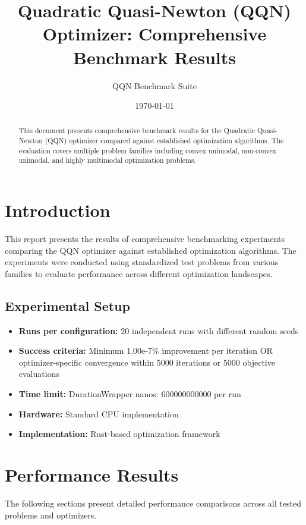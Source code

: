 \documentclass[10pt]{article}
\title{Quadratic Quasi-Newton (QQN) Optimizer: Comprehensive Benchmark Results}
\author{QQN Benchmark Suite}
\date{\today}
\begin{document}
\small
\maketitle
\begin{abstract}
This document presents comprehensive benchmark results for the Quadratic Quasi-Newton (QQN) optimizer compared against established optimization algorithms. The evaluation covers multiple problem families including convex unimodal, non-convex unimodal, and highly multimodal optimization problems.
\end{abstract}
\section{Introduction}
This report presents the results of comprehensive benchmarking experiments comparing the QQN optimizer against established optimization algorithms. The experiments were conducted using standardized test problems from various families to evaluate performance across different optimization landscapes.
\subsection{Experimental Setup}
\begin{itemize}
\item \textbf{Runs per configuration:} 20 independent runs with different random seeds
\item \textbf{Success criteria:} Minimum 1.00e-7\% improvement per iteration OR optimizer-specific convergence within 5000 iterations or 5000 objective evaluations
\item \textbf{Time limit:} DurationWrapper { nanos: 600000000000 } per run
\item \textbf{Hardware:} Standard CPU implementation
\item \textbf{Implementation:} Rust-based optimization framework
\end{itemize}
\section{Performance Results}
The following sections present detailed performance comparisons across all tested problems and optimizers.
\end{document}
